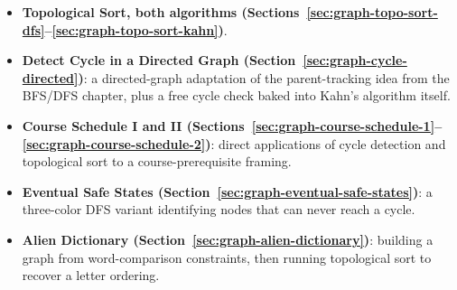 \begin{patternbox}
\begin{itemize}
  \item \textbf{Topological Sort, both algorithms (Sections~\ref{sec:graph-topo-sort-dfs}--\ref{sec:graph-topo-sort-kahn})}.
  \item \textbf{Detect Cycle in a Directed Graph (Section~\ref{sec:graph-cycle-directed})}:
        a directed-graph adaptation of the parent-tracking idea from
        the BFS/DFS chapter, plus a free cycle check baked into Kahn's
        algorithm itself.
  \item \textbf{Course Schedule I and II (Sections~\ref{sec:graph-course-schedule-1}--\ref{sec:graph-course-schedule-2})}:
        direct applications of cycle detection and topological sort to
        a course-prerequisite framing.
  \item \textbf{Eventual Safe States (Section~\ref{sec:graph-eventual-safe-states})}:
        a three-color DFS variant identifying nodes that can never
        reach a cycle.
  \item \textbf{Alien Dictionary (Section~\ref{sec:graph-alien-dictionary})}:
        building a graph from word-comparison constraints, then
        running topological sort to recover a letter ordering.
\end{itemize}
\end{patternbox}

\newpage








